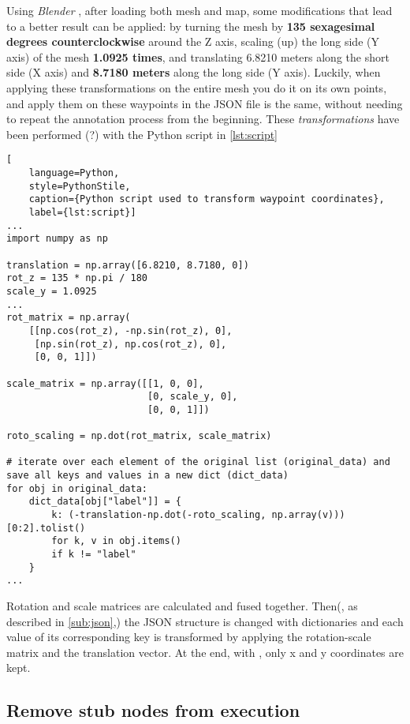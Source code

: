 Using \textit{Blender} \cite{blender}, after loading both mesh and map, some modifications that lead to a better result can be applied: by turning the mesh by \textbf{135 sexagesimal degrees counterclockwise} around the Z axis, scaling (up) the long side (Y axis) of the mesh \textbf{1.0925 times}, and translating 6.8210 meters along the short side (X axis) and \textbf{8.7180 meters} along the long side (Y axis). Luckily, when applying these transformations on the entire mesh you do it on its own points, and apply them on these waypoints in the JSON file is the same, without needing to repeat the annotation process from the beginning. These \textit{transformations} have been performed (?)
 with the Python script in \autoref{lst:script}

\applymulticoltrue

\noindent\begin{lstlisting}[
    language=Python,
    style=PythonStile,
    caption={Python script used to transform waypoint coordinates},
    label={lst:script}]
...
import numpy as np

translation = np.array([6.8210, 8.7180, 0])
rot_z = 135 * np.pi / 180
scale_y = 1.0925
...
rot_matrix = np.array(
    [[np.cos(rot_z), -np.sin(rot_z), 0],
     [np.sin(rot_z), np.cos(rot_z), 0],
     [0, 0, 1]])

scale_matrix = np.array([[1, 0, 0], 
                         [0, scale_y, 0],
                         [0, 0, 1]])

roto_scaling = np.dot(rot_matrix, scale_matrix)

# iterate over each element of the original list (original_data) and save all keys and values in a new dict (dict_data)
for obj in original_data:
    dict_data[obj["label"]] = {
        k: (-translation-np.dot(-roto_scaling, np.array(v)))[0:2].tolist()
        for k, v in obj.items()
        if k != "label"
    }
...
\end{lstlisting}

\applymulticolfalse

Rotation and scale matrices are calculated and fused together. Then(, as described in \autoref{sub:json},) the JSON structure is changed with dictionaries and each value of its corresponding key is transformed by applying the rotation-scale matrix and the translation vector. At the end, with \code{[0:2]}, only x and y coordinates are kept.

\subsection*{Remove stub nodes from execution}

